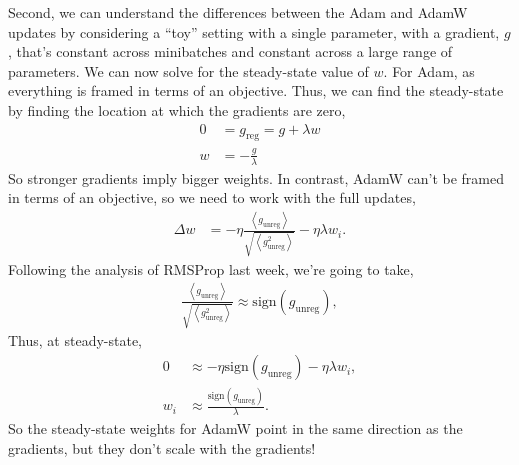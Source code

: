\documentclass{article}
\newcommand{\bracket}[3]{\left#1 #3 \right#2}
\newcommand{\ab}{\bracket{\langle}{\rangle}}
\newcommand{\0}{\mathbf{0}}
\newcommand{\greg}{g_\text{reg}}
\newcommand{\gunreg}{g_\text{unreg}}
\begin{document}
Second, we can understand the differences between the Adam and AdamW updates by considering a ``toy'' setting with a single parameter, with a gradient, $g$, that's constant across minibatches and constant across a large range of parameters.
We can now solve for the steady-state value of $w$.
For Adam, as everything is framed in terms of an objective. 
Thus, we can find the steady-state by finding the location at which the gradients are zero,
\begin{align}
  0 &= \greg = g + \lambda w\\
  w &= -\frac{g}{\lambda}
\end{align}
So stronger gradients imply bigger weights.
In contrast, AdamW can't be framed in terms of an objective, so we need to work with the full updates,
\begin{align}
  \Delta w &= -\eta \frac{\ab{\gunreg}}{\sqrt{\ab{\gunreg^2}}} - \eta \lambda w_i.
\end{align}
Following the analysis of RMSProp last week, we're going to take,
\begin{align}
  \frac{\ab{\gunreg}}{\sqrt{\ab{\gunreg^2}}} \approx \text{sign}(\gunreg),
\end{align}
Thus, at steady-state,
\begin{align}
  0 &\approx -\eta \text{sign}(\gunreg) - \eta \lambda w_i,\\
  w_i &\approx \frac{\text{sign}(\gunreg)}{\lambda}.
\end{align}
So the steady-state weights for AdamW point in the same direction as the gradients, but they don't scale with the gradients!



\newpage
\end{document}

